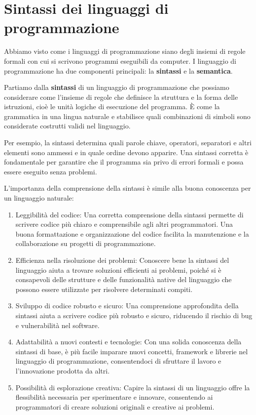 \documentclass[
  letterpaper,
]{scrbook}
\begin{document}
\chapter{Sintassi dei linguaggi di
programmazione}\label{sintassi-dei-linguaggi-di-programmazione}

Abbiamo visto come i linguaggi di programmazione siano degli insiemi di
regole formali con cui si scrivono programmi eseguibili da computer. I
linguaggio di programmazione ha due componenti principali: la
\textbf{sintassi} e la \textbf{semantica}.

Partiamo dalla \textbf{sintassi} di un linguaggio di programmazione che
possiamo considerare come l'insieme di regole che definisce la struttura
e la forma delle istruzioni, cioè le unità logiche di esecuzione del
programma. È come la grammatica in una lingua naturale e stabilisce
quali combinazioni di simboli sono considerate costrutti validi nel
linguaggio.

Per esempio, la sintassi determina quali parole chiave, operatori,
separatori e altri elementi sono ammessi e in quale ordine devono
apparire. Una sintassi corretta è fondamentale per garantire che il
programma sia privo di errori formali e possa essere eseguito senza
problemi.

L'importanza della comprensione della sintassi è simile alla buona
conoscenza per un linguaggio naturale:

\begin{enumerate}
\def\labelenumi{\arabic{enumi}.}
\item
  Leggibilità del codice: Una corretta comprensione della sintassi
  permette di scrivere codice più chiaro e comprensibile agli altri
  programmatori. Una buona formattazione e organizzazione del codice
  facilita la manutenzione e la collaborazione su progetti di
  programmazione.
\item
  Efficienza nella risoluzione dei problemi: Conoscere bene la sintassi
  del linguaggio aiuta a trovare soluzioni efficienti ai problemi,
  poiché si è consapevoli delle strutture e delle funzionalità native
  del linguaggio che possono essere utilizzate per risolvere determinati
  compiti.
\item
  Sviluppo di codice robusto e sicuro: Una comprensione approfondita
  della sintassi aiuta a scrivere codice più robusto e sicuro, riducendo
  il rischio di bug e vulnerabilità nel software.
\item
  Adattabilità a nuovi contesti e tecnologie: Con una solida conoscenza
  della sintassi di base, è più facile imparare nuovi concetti,
  framework e librerie nel linguaggio di programmazione, consentendoci
  di sfruttare il lavoro e l'innovazione prodotta da altri.
\item
  Possibilità di esplorazione creativa: Capire la sintassi di un
  linguaggio offre la flessibilità necessaria per sperimentare e
  innovare, consentendo ai programmatori di creare soluzioni originali e
  creative ai problemi.
\end{enumerate}
\end{document}
